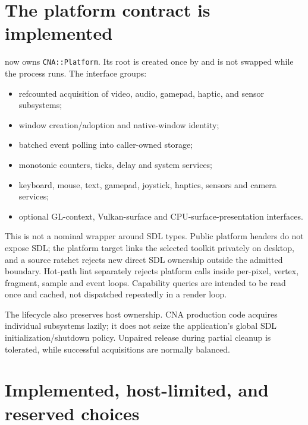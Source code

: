 \section{The platform contract is implemented}

 now owns \texttt{CNA::Platform}. Its root
 is created once by  and is not swapped while the
process runs. The interface groups:

\begin{itemize}
  \item refcounted acquisition of video, audio, gamepad, haptic, and sensor subsystems;
  \item window creation/adoption and native-window identity;
  \item batched event polling into caller-owned storage;
  \item monotonic counters, ticks, delay and system services;
  \item keyboard, mouse, text, gamepad, joystick, haptics, sensors and camera services;
  \item optional GL-context, Vulkan-surface and CPU-surface-presentation interfaces.
\end{itemize}

This is not a nominal wrapper around SDL types. Public platform headers do not expose SDL; the
platform target links the selected toolkit privately on desktop, and a source ratchet rejects new
direct SDL ownership outside the admitted boundary. Hot-path lint separately rejects platform
calls inside per-pixel, vertex, fragment, sample and event loops. Capability queries are intended
to be read once and cached, not dispatched repeatedly in a render loop.

The lifecycle also preserves host ownership. CNA production code acquires individual subsystems
lazily; it does not seize the application's global SDL initialization/shutdown policy. Unpaired
release during partial cleanup is tolerated, while successful acquisitions are normally balanced.

\section{Implemented, host-limited, and reserved choices}

